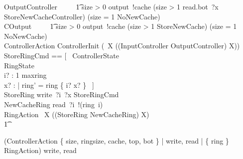 \documentclass{article}
\begin{document}
\begin{circus}
    OutputController ~~\circdef~~
            \t1 \lcircguard size > 0 \rcircguard \circguard output~!cache \then
            (\lcircguard size > 1 \rcircguard \circguard read.bot~?x \then StoreNewCacheController)
            \extchoice
            (\lcircguard size = 1 \rcircguard \circguard NoNewCache) \\
    COutput ~~\circdef~~
            \t1 \lcircguard size > 0 \rcircguard \circguard output~!cache \then
            (\lcircguard size > 1 \rcircguard \circguard StoreNewCache)
            \extchoice
            (\lcircguard size = 1 \rcircguard \circguard NoNewCache) \\


    ControllerAction \circdef ControllerInit \circseq (\circmu\ X \circspot ((InputController \extchoice OutputController) \circseq X)) \\

    StoreRingCmd == [~
            \Xi ControllerState
            \\%
            \Delta RingState
            \\%
            i? : 1 \upto maxring
            \\%
            x? : \nat
        |
            ring' = ring \oplus \{ i? \mapsto x? \} ~] \\

   StoreRing \circdef write~?i~?x \then StoreRingCmd \\
   NewCacheRing \circdef read~?i~!(ring~i) \then \Skip \\

   RingAction \circdef \circmu\ X \circspot ((StoreRing \extchoice NewCacheRing) \circseq X) \\
    \t1 \circspot

   (ControllerAction \lpar
        \{ size, ringsize, cache, top, bot \} |
        \lchanset write, read \rchanset |
        \{ ring \} \rpar
    RingAction) \circhide \lchanset write, read \rchanset \\
    \circend
\end{circus}

\CircusDeclSummary
\end{document}
